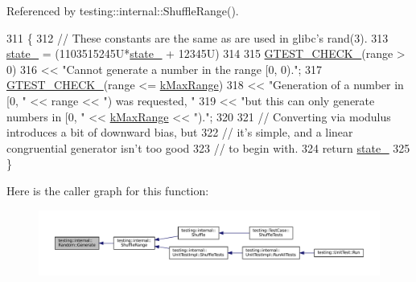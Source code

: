 Referenced by testing\+::internal\+::\+Shuffle\+Range().


\begin{DoxyCode}
311                                     \{
312   \textcolor{comment}{// These constants are the same as are used in glibc's rand(3).}
313   \hyperlink{classtesting_1_1internal_1_1Random_ad500e33e3342415afb8a3ab242afa9cc}{state\_} = (1103515245U*\hyperlink{classtesting_1_1internal_1_1Random_ad500e33e3342415afb8a3ab242afa9cc}{state\_} + 12345U) %
314 
315   \hyperlink{gtest-port_8h_ab54343f0a36dc4cb0ce8a478dd7847b8}{GTEST\_CHECK\_}(range > 0)
316       << \textcolor{stringliteral}{"Cannot generate a number in the range [0, 0)."};
317   \hyperlink{gtest-port_8h_ab54343f0a36dc4cb0ce8a478dd7847b8}{GTEST\_CHECK\_}(range <= \hyperlink{classtesting_1_1internal_1_1Random_a36d72dd7063d0b5338f229e75382fdd2}{kMaxRange})
318       << \textcolor{stringliteral}{"Generation of a number in [0, "} << range << \textcolor{stringliteral}{") was requested, "}
319       << \textcolor{stringliteral}{"but this can only generate numbers in [0, "} << \hyperlink{classtesting_1_1internal_1_1Random_a36d72dd7063d0b5338f229e75382fdd2}{kMaxRange} << \textcolor{stringliteral}{")."};
320 
321   \textcolor{comment}{// Converting via modulus introduces a bit of downward bias, but}
322   \textcolor{comment}{// it's simple, and a linear congruential generator isn't too good}
323   \textcolor{comment}{// to begin with.}
324   \textcolor{keywordflow}{return} \hyperlink{classtesting_1_1internal_1_1Random_ad500e33e3342415afb8a3ab242afa9cc}{state\_} %
325 \}
\end{DoxyCode}
Here is the caller graph for this function\+:
\nopagebreak
\begin{figure}[H]
\begin{center}
\leavevmode
\includegraphics[width=350pt]{classtesting_1_1internal_1_1Random_a9315b7fb621cbcfdf92ed4b5e584c0db_icgraph}
\end{center}
\end{figure}
\mbox{\label{classtesting_1_1internal_1_1Random_aa2f476d8cfe29f928b90d7339c849734}} 
